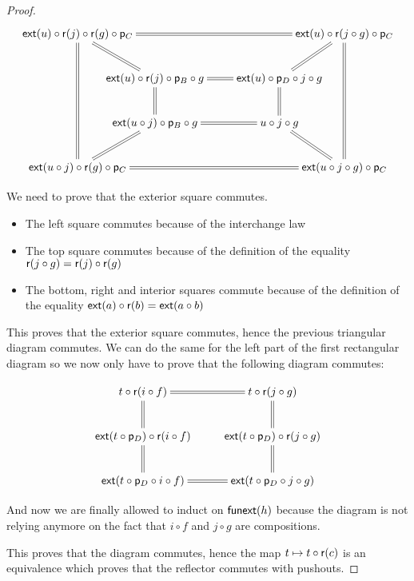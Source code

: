 \begin{proof}
  \[\xymatrix@C=-30pt{
    \extend{u}\circ\reflect(j)\circ\reflect(g)\circ\project_C
      \ar@{=}[rrrr] \ar@{=}[ddd] \ar@{=}[rd] & & & &
    \extend{u}\circ\reflect(j\circ g)\circ\project_C
      \ar@{=}[ld] \ar@{=}[ddd] \\ &
    \extend{u}\circ\reflect(j)\circ\project_B\circ g
      \ar@{=}[rr] \ar@{=}[d] & {\phantom{thisisanuglyhack}} &
    \extend{u}\circ\project_D\circ j\circ g
      \ar@{=}[d] & \\ &
    \extend{u\circ j}\circ\project_B\circ g
      \ar@{=}[rr] \ar@{=}[ld] & &
    u\circ j\circ g
      \ar@{=}[rd] & \\
    \extend{u\circ j}\circ\reflect(g)\circ\project_C
      \ar@{=}[rrrr] & & & &
    \extend{u\circ j\circ g}\circ\project_C
  }\]

  We need to prove that the exterior square commutes.

  \begin{itemize}
  \item The left square commutes because of the interchange law
  \item The top square commutes because of the definition of the equality
    $\mathsf{r}(j\circ g)=\mathsf{r}(j)\circ\mathsf{r}(g)$
  \item The bottom, right and interior squares commute because of the definition
    of the equality $\mathsf{ext}(a)\circ\mathsf{r}(b)=\mathsf{ext}(a\circ b)$
  \end{itemize}

  This proves that the exterior square commutes, hence the previous triangular
  diagram commutes. We can do the same for the left part of the first
  rectangular diagram so we now only have to prove that the following diagram
  commutes:

  \[\xymatrix{
    t\circ\reflect(i\circ f) \ar@{=}[r] \ar@{=}[d] &
      t\circ\reflect(j\circ g) \ar@{=}[d] \\
    \extend{t\circ\project_D}\circ\reflect(i\circ f) \ar@{=}[d] &
      \extend{t\circ\project_D}\circ\reflect(j\circ g) \ar@{=}[d] \\
    \extend{t\circ\project_D\circ i\circ f} \ar@{=}[r] &
      \extend{t\circ\project_D\circ j\circ g}\\
  }\]

  And now we are finally allowed to induct on $\mathsf{funext}(h)$ because the diagram
  is not relying anymore on the fact that $i\circ f$ and $j\circ g$ are
  compositions.

  \bigskip

  This proves that the diagram commutes, hence the map
  $t\mapsto{}t\circ\mathsf{r}(c)$ is an equivalence which proves that
  the reflector commutes with pushouts.
\end{proof}

